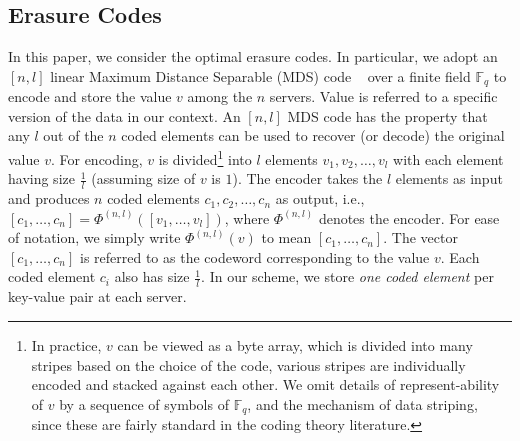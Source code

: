 
\subsection{Erasure Codes}
In this paper, we consider the optimal erasure codes. In particular, we adopt an $[n, l]$  linear Maximum Distance Separable (MDS) code ~\cite{verapless_book} over a finite field $\mathbb{F}_q$ to encode and store the value $v$ among the $n$ servers. Value is referred to a specific version of the data in our context. An $[n, l]$ MDS code has the property that any $l$ out of the $n$ coded elements can be used to recover (or decode) the original value $v$. 
For encoding, $v$ is divided\footnote{In practice, $v$ can be viewed as a byte array, which is divided into many stripes based on the choice of the code, various stripes are individually encoded and stacked against each other. We omit details of represent-ability of $v$ by a sequence of symbols of $\mathbb{F}_q$, and the mechanism of data striping, since these are fairly standard in the coding theory literature.} into $l$ elements $v_1, v_2, \ldots, v_l$ with each element having  size $\frac{1}{l}$ (assuming size of $v$ is $1$). The encoder takes the $l$ elements as input and produces $n$ coded elements $c_1, c_2, \ldots, c_n$ as output, i.e., $[c_1, \ldots, c_n] = \Phi^{(n,l)}([v_1, \ldots, v_l])$, where $\Phi^{(n, l)}$ denotes the encoder. For ease of notation, we simply write $\Phi^{(n, l)}(v)$ to mean  $[c_1, \ldots, c_n]$. The vector $[c_1, \ldots, c_n]$ is  referred to as the codeword corresponding to the value $v$. Each coded element $c_i$ also has  size $\frac{1}{l}$. In our scheme, we store \textit{one coded element} per key-value pair at each server. 

